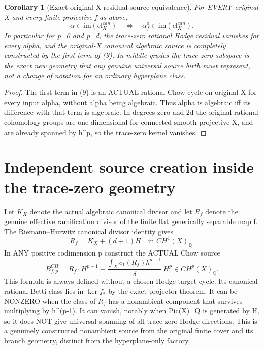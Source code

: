 \documentclass[11pt]{article}
\newtheorem{corollary}[theorem]{Corollary}
\begin{document}
\begin{corollary}[Exact original-X residual source equivalence]
For EVERY original X and every
finite projective f as above,
\[
 \boxed{
 \alpha\in\mathrm{im}(\mathrm{cl}^{can}_X)
 \quad\Longleftrightarrow\quad
 \alpha_f^0\in
   \mathrm{im}(\mathrm{cl}^{can}_X).
 }                                                       \tag{10}
\]
In particular for p=0 and p=d,
the trace-zero rational Hodge
residual vanishes for every alpha,
and the original-X canonical
algebraic source is completely
constructed by the first term
of (9). In middle grades the
trace-zero subspace is the exact
new geometry that any genuine
universal source birth must
represent, not a change of
notation for an ordinary
hyperplane class.
\end{corollary}
\begin{proof}
The first term in (9) is an
ACTUAL rational Chow cycle on
original X for every input alpha,
without alpha being algebraic.
Thus alpha is algebraic iff its
difference with that term is
algebraic. In degrees zero and
2d the original rational
cohomology groups are
one-dimensional for connected
smooth projective X, and are
already spanned by h^p, so the
trace-zero kernel vanishes.
\end{proof}

\section{Independent source creation inside the trace-zero geometry}
Let $K_X$ denote the actual
algebraic canonical divisor
and let $R_f$ denote the genuine
effective ramification divisor
of the finite flat generically
separable map f.
The Riemann--Hurwitz canonical
divisor identity gives
\[
 \boxed{
 R_f=K_X+(d+1)H\quad
          \text{in }CH^1(X)_\mathbb Q .
 }                                                       \tag{11}
\]
In ANY positive codimension p
construct the ACTUAL Chow source
\[
 \boxed{
 B^{CH}_{f,p}=
 R_f\cdot H^{p-1}
 -\frac{\int_X c_1(R_f)h^{d-1}}
        {\delta}\,H^p
 \in CH^p(X)_\mathbb Q .
 }                                                       \tag{12}
\]
This formula is always defined
without a chosen Hodge target
cycle. Its canonical rational
Betti class lies in
$\ker f_*$ by the exact
projector theorem. It can be
NONZERO when the class of
$R_f$ has a nonambient component
that survives multiplying by
h^(p-1). It can vanish,
notably when Pic(X)_Q is
generated by H, so it does
NOT give universal spanning
of all trace-zero Hodge
directions. This is a genuinely
constructed nonambient source
from the original finite cover
and its branch geometry, distinct
from the hyperplane-only factory.
\end{document}
